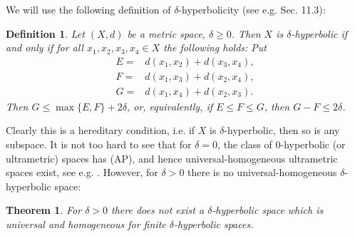 \documentclass{amsart}
\renewcommand{\d}{\delta}
\newtheorem{theorem}[defi]{Theorem}
\newtheorem{definition}[defi]{Definition}
\begin{document}
We will use the following definition of $\delta$-hyperbolicity (see e.g. \cite{DK} Sec. 11.3):

\begin{definition}\label{def:hyperbolic}
Let $(X,d)$ be a metric space, $\d\geq 0$. Then $X$ is $\d$-hyperbolic if and only if for all $x_1, x_2, x_3, x_4\in X$  the following holds: Put
\begin{align*}
E=&d(x_1, x_2)+d(x_3,x_4),\\
 F=&d(x_1, x_3)+d(x_2,x_4),\\ 
 G=&d(x_1, x_4)+d(x_2,x_3).
\end{align*}
\noindent
Then $G\leq \max\{E, F\}+2\d$, or, equivalently, if $E\leq F\leq G$, then $G-F\leq 2\d$.
\end{definition}


Clearly this is a hereditary condition, i.e. if $X$ is $\d$-hyperbolic, then so is any subspace.
It is not too hard to see that for $\d=0$, the class of $0$-hyperbolic (or ultrametric) spaces has (AP), and hence universal-homogeneous ultrametric spaces exist, see e.g. \cite{Ishiki1, Ishiki2, Lemin1, Lemin2, Wan}.
However,  for $\d>0$ there is no universal-homogeneous  $\d$-hyperbolic space:

\begin{theorem}\label{thm: no universal-homogeneous dh}
For $\d>0$ there does not exist a  $\d$-hyperbolic space which is universal and homogeneous for finite $\d$-hyperbolic spaces. 
\end{theorem}
\end{document}
